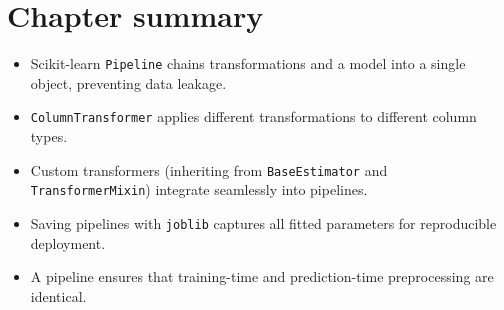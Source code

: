 \section{Chapter summary}

\begin{itemize}
  \item Scikit-learn \texttt{Pipeline} chains transformations and a model into a single object, preventing data leakage.
  \item \texttt{ColumnTransformer} applies different transformations to different column types.
  \item Custom transformers (inheriting from \texttt{BaseEstimator} and \texttt{TransformerMixin}) integrate seamlessly into pipelines.
  \item Saving pipelines with \texttt{joblib} captures all fitted parameters for reproducible deployment.
  \item A pipeline ensures that training-time and prediction-time preprocessing are identical.
\end{itemize}

